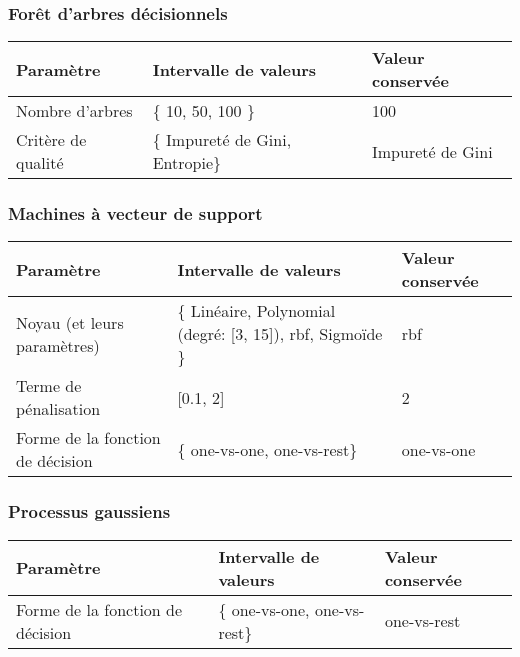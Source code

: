 \subsubsection*{Forêt d'arbres décisionnels}

\noindent
\begin{tabularx}{\textwidth}{|X|X|X|}
    \hline
    \bf{Paramètre} & \bf{Intervalle de valeurs} & \bf{Valeur conservée}\\
    \hline
    Nombre d'arbres  & \{ 10, 50, 100 \} & 100\\\hline
    Critère de qualité & \{ Impureté de Gini, Entropie\} & Impureté de Gini\\\hline
\end{tabularx}

\subsubsection*{Machines à vecteur de support}

\noindent
\begin{tabularx}{\textwidth}{|X|X|X|}
    \hline
    \bf{Paramètre} & \bf{Intervalle de valeurs} & \bf{Valeur conservée}\\
    \hline
    Noyau (et leurs paramètres)  & \{ Linéaire, Polynomial (degré: [3, 15]), rbf, Sigmoïde \} & rbf \\\hline
    Terme de pénalisation  & [0.1, 2] & 2\\\hline
    Forme de la fonction de décision  & \{ one-vs-one, one-vs-rest\} & one-vs-one \\\hline
\end{tabularx}

\subsubsection*{Processus gaussiens}

\noindent
\begin{tabularx}{\textwidth}{|X|X|X|}
    \hline
    \bf{Paramètre} & \bf{Intervalle de valeurs} & \bf{Valeur conservée}\\
    \hline
     Forme de la fonction de décision  & \{ one-vs-one, one-vs-rest\} & one-vs-rest \\\hline
\end{tabularx}
